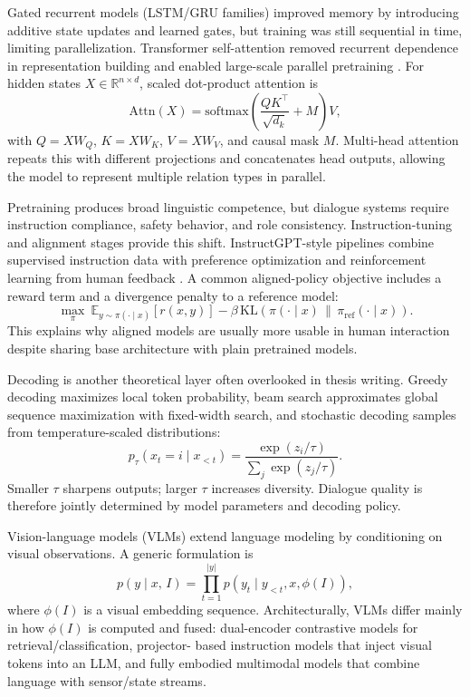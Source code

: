   Gated recurrent models (LSTM/GRU families) improved memory by introducing additive state updates and learned gates, but training was still sequential in time, limiting parallelization. Transformer
  self-attention removed recurrent dependence in representation building and enabled large-scale parallel pretraining \cite{vaswani2023attentionneed}. For hidden states \(X\in\mathbb{R}^{n\times d}\),
  scaled dot-product attention is
  \[
  \mathrm{Attn}(X)=\mathrm{softmax}\!\left(\frac{QK^\top}{\sqrt{d_k}}+M\right)V,
  \]
  with \(Q=XW_Q\), \(K=XW_K\), \(V=XW_V\), and causal mask \(M\). Multi-head attention repeats this with different projections and concatenates head outputs, allowing the model to represent multiple
  relation types in parallel.

  Pretraining produces broad linguistic competence, but dialogue systems require instruction compliance, safety behavior, and role consistency. Instruction-tuning and alignment stages provide this shift.
  InstructGPT-style pipelines combine supervised instruction data with preference optimization and reinforcement learning from human feedback \cite{ouyang2022traininglanguagemodelsfollow}. A common
  aligned-policy objective includes a reward term and a divergence penalty to a reference model:
  \[
  \max_{\pi}\ \mathbb{E}_{y\sim \pi(\cdot\mid x)}[r(x,y)]-\beta\,\mathrm{KL}\!\left(\pi(\cdot\mid x)\,\|\,\pi_{\mathrm{ref}}(\cdot\mid x)\right).
  \]
  This explains why aligned models are usually more usable in human interaction despite sharing base architecture with plain pretrained models.

  Decoding is another theoretical layer often overlooked in thesis writing. Greedy decoding maximizes local token probability, beam search approximates global sequence maximization with fixed-width
  search, and stochastic decoding samples from temperature-scaled distributions:
  \[
  p_\tau(x_t=i\mid x_{<t})=\frac{\exp(z_i/\tau)}{\sum_j \exp(z_j/\tau)}.
  \]
  Smaller \(\tau\) sharpens outputs; larger \(\tau\) increases diversity. Dialogue quality is therefore jointly determined by model parameters and decoding policy.

  Vision-language models (VLMs) extend language modeling by conditioning on visual observations. A generic formulation is
  \[
  p(y\mid x,\,I)=\prod_{t=1}^{|y|}p(y_t\mid y_{<t},x,\phi(I)),
  \]
  where \(\phi(I)\) is a visual embedding sequence. Architecturally, VLMs differ mainly in how \(\phi(I)\) is computed and fused: dual-encoder contrastive models for retrieval/classification, projector-
  based instruction models that inject visual tokens into an LLM, and fully embodied multimodal models that combine language with sensor/state streams.

